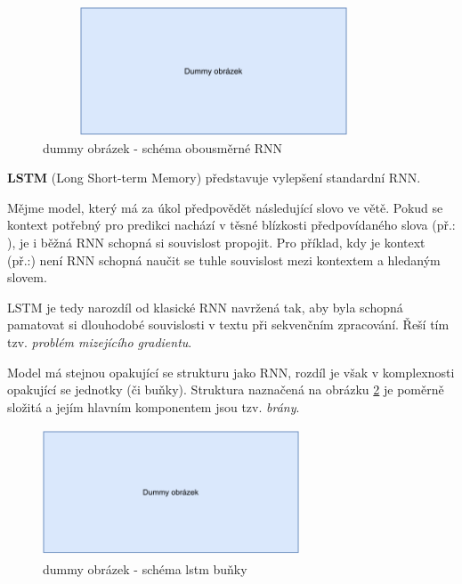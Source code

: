 \begin{figure}[hbt]
	\centering
	\includegraphics[width=4.0in, height=1.5in]{obrazky/dummy_pic.pdf}
	\caption{dummy obrázek - schéma obousměrné RNN}
	\label{bidirRNN}
\end{figure}

\textbf{LSTM} (Long Short-term Memory) představuje vylepšení standardní RNN.\par \smallskip
Mějme model, který má za úkol předpovědět následující slovo ve větě. Pokud se kontext potřebný pro predikci nachází v těsné blízkosti předpovídaného slova (př.: ), je i běžná RNN schopná si souvislost propojit. Pro příklad, kdy je kontext  (př.:) není RNN schopná naučit se tuhle souvislost mezi kontextem a hledaným slovem.\par \smallskip
LSTM je tedy narozdíl od klasické RNN navržená tak, aby byla schopná pamatovat si dlouhodobé souvislosti v textu při sekvenčním zpracování. Řeší tím tzv. \emph{problém mizejícího gradientu}.\par
Model má stejnou opakující se strukturu jako RNN, rozdíl je však v komplexnosti opakující se jednotky (či buňky). Struktura naznačená na obrázku \ref{lstm_cell} je poměrně složitá a jejím hlavním komponentem jsou tzv. \emph{brány}. 

\begin{figure}[hbt]
	\centering
	\includegraphics[width=3.0in, height=1.5in]{obrazky/dummy_pic.pdf}
	\caption{dummy obrázek - schéma lstm buňky}
	\label{lstm_cell}
\end{figure}

